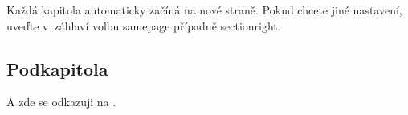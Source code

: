 Každá kapitola automaticky začíná na nové straně. Pokud chcete jiné nastavení, uveďte v~záhlaví volbu samepage případně sectionright.
%


\subsection{Podkapitola}
A zde se odkazuji na \cite{Knuth}.
